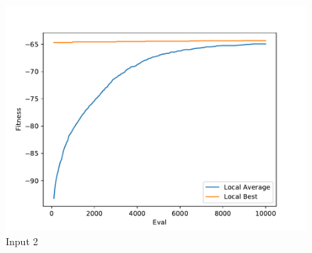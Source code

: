 \documentclass{standalone}
\begin{document}
\begin{figure}[!htb]
	\caption{Input 2}
	\label{fig:graph_2025}
	\includegraphics[width=\textwidth]{../graphs/graphs/2025.pdf}
\end{figure}
\end{document}
